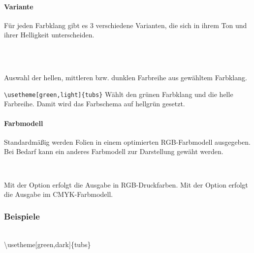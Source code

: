 \paragraph{Variante}
Für jeden Farbklang gibt es 3 verschiedene Varianten, die sich in ihrem Ton
und ihrer Helligkeit unterscheiden.

\begin{Declaration}
  \\
  \\
\end{Declaration}

Auswahl der hellen, mittleren bzw. dunklen Farbreihe aus gewähltem Farbklang.

\begin{example}
\lstinline!\usetheme[green,light]{tubs}! Wählt den grünen Farbklang und die
helle Farbreihe. Damit wird das Farbschema auf hellgrün gesetzt.
\end{example}

\paragraph{Farbmodell}
Standardmäßig werden Folien in einem optimierten RGB-Farbmodell ausgegeben.
Bei Bedarf kann ein anderes Farbmodell zur Darstellung gewäht werden.


\begin{Declaration}
  \\
\end{Declaration}

Mit der Option  erfolgt die Ausgabe in RGB-Druckfarben.
Mit der Option  erfolgt die Ausgabe im CMYK-Farbmodell.

\clearpage
\subsubsection{Beispiele}

\begin{center}
\begin{minipage}{0.49\textwidth}
\end{minipage}\hfill
\begin{minipage}{0.49\textwidth}
\end{minipage}\medskip\\
{\ttfamily \textbackslash usetheme[green,dark]\{tubs\}}
\end{center}

